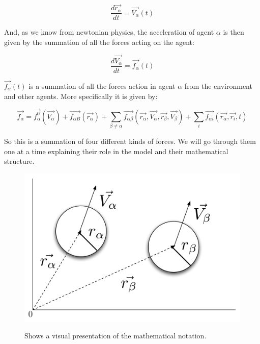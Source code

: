\begin{equation}
		\frac{d \vec{r_{\alpha}}}{dt} = \vec{V_{\alpha}} \left( t \right)
\end{equation}

And, as we know from newtonian physics, the acceleration of agent $\alpha$ is 
then given by the summation of all the forces acting on the agent:

\begin{equation}
    \frac{d \vec{V_{\alpha}}}{dt} = \vec{f_{\alpha}} \left( t \right) 
\end{equation}

$\vec{f_{\alpha}} \left( t \right)$ is a summation of all the forces action in 
agent $\alpha$ from the environment and other agents. More specifically it is given by:

\begin{equation}\label{model}
    \vec{f_{\alpha}} = \vec{f^{0}_{\alpha}}\left( \vec{V_{\alpha}} \right) + 
    \vec{f_{\alpha B}} \left( \vec{r_{\alpha}} \right) +
    \sum_{\beta \neq \alpha} \vec{f_{\alpha \beta}} \left(\vec{r_{\alpha}}, 
    \vec{V_{\alpha}}, \vec{r_{\beta}}, \vec{V_{\beta}} \right) +
    \sum_{i} \vec{f_{\alpha i}} \left( \vec{r_{\alpha}}, \vec{r_{i}}, t 
    \right)
\end{equation}

So this is a summation of four different kinds of forces. We will go through 
them one at a time explaining their role in the model and their mathematical 
structure.\\

\begin{figure}[hb]
    \centering
    {\includegraphics[scale=0.35]{Figures/NotationOAgent.pdf}} 
    \caption{Shows a visual presentation of the mathematical notation.}
    \label{NotationOAgent}
\end{figure}

